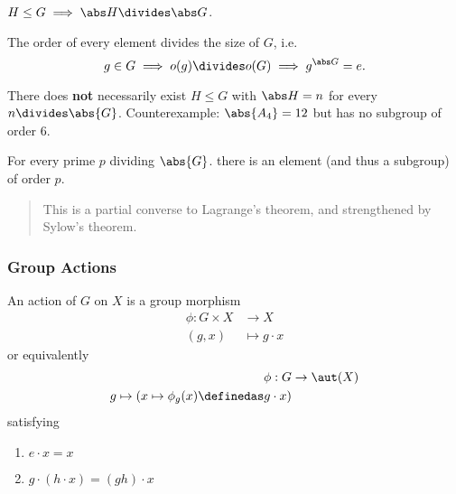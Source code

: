 \begin{theorem}

\(H \leq G \implies \abs H \divides \abs G\).

\end{theorem}

\begin{corollary}

The order of every element divides the size of \(G\), i.e. \[
  g\in G \implies o(g) \divides o(G) \implies g^{\abs G} = e
  .\]

\end{corollary}

\begin{warning}

There does \textbf{not} necessarily exist \(H \leq G\) with
\(\abs H = n\) for every \(n \divides \abs{G}\). Counterexample:
\(\abs{A_4} = 12\) but has no subgroup of order 6.

\end{warning}

\begin{theorem}

For every prime \(p\) dividing \(\abs{G}\). there is an element (and
thus a subgroup) of order \(p\).

\end{theorem}

\begin{quote}
This is a partial converse to Lagrange's theorem, and strengthened by
Sylow's theorem.
\end{quote}

\hypertarget{group-actions}{%
\subsubsection{Group Actions}\label{group-actions}}

\begin{definition}

An action of \(G\) on \(X\) is a group morphism \begin{align*}
\phi:G \times X &\rightarrow X \\ 
(g,x) &\mapsto g\cdot x
\end{align*} or equivalently \begin{align*}
\phi: G &\to \aut(X) \\
g \mapsto (x \mapsto \phi_g(x) \definedas g\cdot x)
\end{align*} satisfying

\begin{enumerate}
\def\labelenumi{\arabic{enumi}.}
\tightlist
\item
  \(e\cdot x = x\)
\item
  \(g\cdot (h\cdot x) = (gh)\cdot x\)
\end{enumerate}

\end{definition}

